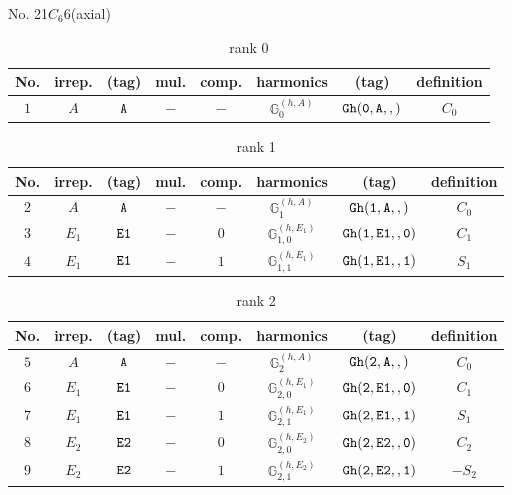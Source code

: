 \documentclass[fleqn,8pt]{jsarticle}
\begin{document}
\setcounter{MaxMatrixCols}{16}

\begin{center}
\LARGE
No. 21\quad$C_{6}$\quad$6$\quad[ hexagonal ] (axial)
\end{center}
\begin{table}[ht!]
\begin{center}
\caption{rank 0}
\renewcommand{\arraystretch}{1.3}
\begin{tabular}{cccccccc} \hline \hline
No. & irrep. & (tag) & mul. & comp. & harmonics & (tag) & definition \\ \hline
$ 1 $ & $ A $ & $ {\tt A} $ & $ - $ & $ - $ & $ \mathbb{G}_{0}^{(h,A)} $ & $ {\tt Gh(0,A,,)} $ & $ C_{0} $ \\
 \hline \hline
\end{tabular}
\end{center}
\end{table}
\begin{table}[ht!]
\begin{center}
\caption{rank 1}
\renewcommand{\arraystretch}{1.3}
\begin{tabular}{cccccccc} \hline \hline
No. & irrep. & (tag) & mul. & comp. & harmonics & (tag) & definition \\ \hline
$ 2 $ & $ A $ & $ {\tt A} $ & $ - $ & $ - $ & $ \mathbb{G}_{1}^{(h,A)} $ & $ {\tt Gh(1,A,,)} $ & $ C_{0} $ \\
$ 3 $ & $ E_{1} $ & $ {\tt E1} $ & $ - $ & $ 0 $ & $ \mathbb{G}_{1,0}^{(h,E_{1})} $ & $ {\tt Gh(1,E1,,0)} $ & $ C_{1} $ \\
$ 4 $ & $ E_{1} $ & $ {\tt E1} $ & $ - $ & $ 1 $ & $ \mathbb{G}_{1,1}^{(h,E_{1})} $ & $ {\tt Gh(1,E1,,1)} $ & $ S_{1} $ \\
 \hline \hline
\end{tabular}
\end{center}
\end{table}
\begin{table}[ht!]
\begin{center}
\caption{rank 2}
\renewcommand{\arraystretch}{1.3}
\begin{tabular}{cccccccc} \hline \hline
No. & irrep. & (tag) & mul. & comp. & harmonics & (tag) & definition \\ \hline
$ 5 $ & $ A $ & $ {\tt A} $ & $ - $ & $ - $ & $ \mathbb{G}_{2}^{(h,A)} $ & $ {\tt Gh(2,A,,)} $ & $ C_{0} $ \\
$ 6 $ & $ E_{1} $ & $ {\tt E1} $ & $ - $ & $ 0 $ & $ \mathbb{G}_{2,0}^{(h,E_{1})} $ & $ {\tt Gh(2,E1,,0)} $ & $ C_{1} $ \\
$ 7 $ & $ E_{1} $ & $ {\tt E1} $ & $ - $ & $ 1 $ & $ \mathbb{G}_{2,1}^{(h,E_{1})} $ & $ {\tt Gh(2,E1,,1)} $ & $ S_{1} $ \\
$ 8 $ & $ E_{2} $ & $ {\tt E2} $ & $ - $ & $ 0 $ & $ \mathbb{G}_{2,0}^{(h,E_{2})} $ & $ {\tt Gh(2,E2,,0)} $ & $ C_{2} $ \\
$ 9 $ & $ E_{2} $ & $ {\tt E2} $ & $ - $ & $ 1 $ & $ \mathbb{G}_{2,1}^{(h,E_{2})} $ & $ {\tt Gh(2,E2,,1)} $ & $ - S_{2} $ \\
 \hline \hline
\end{tabular}
\end{center}
\end{table}
\end{document}
